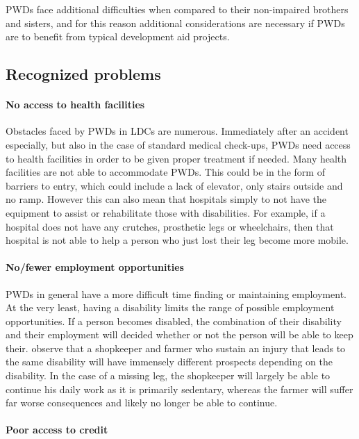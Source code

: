 \documentclass[a4paper]{article}
\begin{document}
PWDs face additional difficulties when compared to their non-impaired brothers
and sisters, and for this reason additional considerations are necessary if
PWDs are to benefit from typical development aid projects.


\subsection{Recognized problems}

\paragraph{No access to health facilities}

Obstacles faced by PWDs in LDCs are numerous. Immediately after an accident
especially, but also in the case of standard medical check-ups, PWDs need
access to health facilities in order to be given proper treatment if needed.
Many health facilities are not able to accommodate PWDs. This could be in the
form of barriers to entry, which could include a lack of elevator, only stairs
outside and no ramp. However this can also mean that hospitals simply to not
have the equipment to assist or rehabilitate those with disabilities. For
example, if a hospital does not have any crutches, prosthetic legs or
wheelchairs, then that hospital is not able to help a person who just lost
their leg become more mobile. 


\paragraph{No/fewer employment opportunities}

PWDs in general have a more difficult time finding or maintaining employment.
At the very least, having a disability limits the range of possible employment
opportunities. If a person becomes disabled, the combination of their
disability and their employment will decided whether or not the person will be
able to keep their. \cite{chowdhury2006economics} observe that a shopkeeper
and farmer who sustain an injury that leads to the same disability will have
immensely different prospects depending on the disability. In the case of a
missing leg, the shopkeeper will largely be able to continue his daily work as
it is primarily sedentary, whereas the farmer will suffer far worse
consequences and likely no longer be able to continue.

\paragraph{Poor access to credit}
\end{document}
